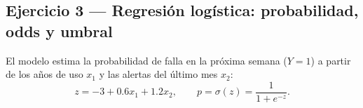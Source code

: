 \subsection{Ejercicio 3 --- Regresión logística: probabilidad, odds y umbral}

El modelo estima la probabilidad de falla en la próxima semana ($Y=1$)
a partir de los años de uso $x_1$ y las alertas del último mes $x_2$:
\[
    z = -3 + 0.6x_1 + 1.2x_2, \qquad p = \sigma(z) = \frac{1}{1+e^{-z}} .
\]

